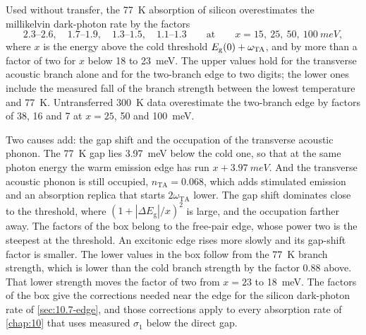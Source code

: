 \begin{keyresult}
Used without transfer, the \SI{77}{K} absorption of silicon overestimates the millikelvin dark-photon rate by the factors
\begin{equation*}
  2.3\text{--}2.6,\quad 1.7\text{--}1.9,\quad 1.3\text{--}1.5,\quad 1.1\text{--}1.3 \qquad \text{at} \qquad x = 15,\ 25,\ 50,\ \SI{100}{meV} ,
\end{equation*}
where $x$ is the energy above the cold threshold $E_{\mathrm{g}}(0) + \omega_{\mathrm{TA}}$, and by more than a factor of two for $x$ below 18 to \SI{23}{meV}. The upper values hold for the transverse acoustic branch alone and for the two-branch edge to two digits; the lower ones include the measured fall of the branch strength between the lowest temperature and \SI{77}{K}. Untransferred \SI{300}{K} data overestimate the two-branch edge by factors of 38, 16 and 7 at $x = 25$, 50 and \SI{100}{meV}.
\end{keyresult}
\noindent Two causes add: the gap shift and the occupation of the transverse acoustic phonon. The \SI{77}{K} gap lies \SI{3.97}{meV} below the cold one, so that at the same photon energy the warm emission edge has run $x + \SI{3.97}{meV}$. And the transverse acoustic phonon is still occupied, $n_{\mathrm{TA}} = 0.068$, which adds stimulated emission and an absorption replica that starts $2\omega_{\mathrm{TA}}$ lower. The gap shift dominates close to the threshold, where $(1 + |\Delta E_{\mathrm{g}}|/x)^2$ is large, and the occupation farther away. The factors of the box belong to the free-pair edge, whose power two is the steepest at the threshold. An excitonic edge rises more slowly and its gap-shift factor is smaller. The lower values in the box follow from the \SI{77}{K} branch strength, which is lower than the cold branch strength by the factor 0.88 above. That lower strength moves the factor of two from $x = 23$ to \SI{18}{meV}. The factors of the box give the corrections needed near the edge for the silicon dark-photon rate of \cref{sec:10.7-edge}, and those corrections apply to every absorption rate of \cref{chap:10} that uses measured $\sigma_1$ below the direct gap.

